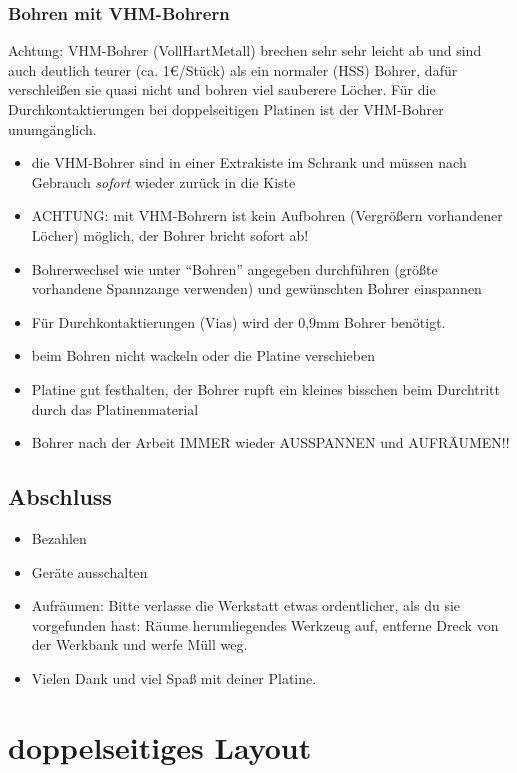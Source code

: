 \documentclass{\basedir/fablab-document}
\begin{document}
\subsubsection{Bohren mit VHM-Bohrern}
Achtung: VHM-Bohrer (VollHartMetall) brechen sehr sehr leicht ab und sind auch deutlich teurer (ca. 1€/Stück) als ein normaler (HSS) Bohrer, dafür verschleißen sie quasi nicht und bohren viel sauberere Löcher.
Für die Durchkontaktierungen bei doppelseitigen Platinen ist der VHM-Bohrer unumgänglich.
\begin{itemize}
\item die VHM-Bohrer sind in einer Extrakiste im Schrank und müssen nach Gebrauch \emph{sofort} wieder zurück in die Kiste
\item ACHTUNG: mit VHM-Bohrern ist kein Aufbohren (Vergrößern vorhandener Löcher) möglich, der Bohrer bricht sofort ab!
\item Bohrerwechsel wie unter ``Bohren'' angegeben durchführen (größte vorhandene Spannzange verwenden) und gewünschten Bohrer einspannen
\item Für Durchkontaktierungen (Vias) wird der 0,9mm Bohrer benötigt.
\item beim Bohren nicht wackeln oder die Platine verschieben
\item Platine gut festhalten, der Bohrer rupft ein kleines bisschen beim Durchtritt durch das Platinenmaterial
\item Bohrer nach der Arbeit IMMER wieder AUSSPANNEN und AUFRÄUMEN!!
\end{itemize}




\subsection{Abschluss}
\newcommand{\abschluss}{
\begin{itemize}
 \item Bezahlen
 \item Geräte ausschalten
 \item Aufräumen: Bitte verlasse die Werkstatt etwas ordentlicher, als du sie vorgefunden hast: Räume herumliegendes Werkzeug auf, entferne Dreck von der Werkbank und werfe Müll weg.
 \item Vielen Dank und viel Spaß mit deiner Platine.
\end{itemize}}

\abschluss

\newpage


\section{doppelseitiges Layout}
\end{document}
